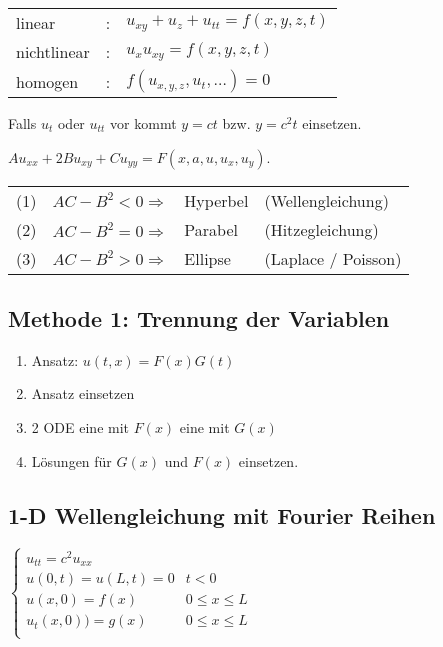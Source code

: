 \documentclass[10pt,a4paper]{scrartcl}
\newcommand{\compaqn}{\setlength{\itemsep}{0mm}\setlength{\parskip}{0cm}}%
\begin{document}
\begin{multicols*}{3}
	\begin{tabularx}{\linewidth}{|XXl|}
	\hline
	linear  & : & $u_{xy}+u_{z}+u_{tt}=f(x,y,z,t)$\\
	nichtlinear & : & $u_{x}u_{xy}=f(x,y,z,t)$\\
	homogen & : & $f(u_{x,y,z},u_{t},\ldots)=0$\\
	\hline
	\end{tabularx}
	
	Falls $u_t$ oder $u_{tt}$ vor kommt $y=ct$ bzw. $y=c^2t$ einsetzen.	
	
	$Au_{xx}+2Bu_{xy}+Cu_{yy}=F(x,a,u,u_{x},u_{y})$.
	
	\begin{tabular}{llll}
	(1)&$AC-B^2<0 \Rightarrow$& Hyperbel &(Wellengleichung)\\
	(2)&$AC-B^2=0 \Rightarrow$& Parabel &(Hitzegleichung)\\
	(3)&$AC-B^2>0 \Rightarrow$& Ellipse &(Laplace / Poisson)\\
	\end{tabular}
	
	\subsection{Methode 1: Trennung der Variablen}
	
	\begin{enumerate}
	\compaqn
	\item
	Ansatz: $u(t,x) = F(x)G(t)$
	\item
	Ansatz einsetzen
	\item
	2 ODE eine mit $F(x)$ eine mit $G(x)$
	\item
	Lösungen für $G(x)$ und $F(x)$ einsetzen.
	\end{enumerate}
	
	\finn	
	
	\subsection{1-D Wellengleichung mit Fourier Reihen }
	
	\begin{center}
	$
	\begin{cases}
	u_{tt} = c^2u_{xx}&\\
	u(0,t)=u(L,t)=0 & t<0\\
	u(x,0)=f(x)&0\leq x\leq L\\
	u_t(x,0))=g(x)&0\leq x\leq L\\
	\end{cases}
	$
	\end{center}
	

\end{multicols*}
\end{document}
